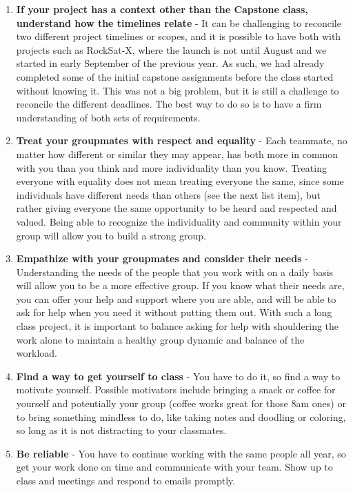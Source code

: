 \documentclass[letterpaper,10pt]{article}
\begin{document}
\begin{enumerate}
{}
\item{
\textbf{If your project has a context other than the Capstone class, understand how the timelines relate} -  It can be challenging to reconcile two different project timelines or scopes, and it is possible to have both with projects such as RockSat-X, where the launch is not until August and we started in early September of the previous year. As such, we had already completed some of the initial capstone assignments before the class started without knowing it. This was not a big problem, but it is still a challenge to reconcile the different deadlines. The best way to do so is to have a firm understanding of both sets of requirements.
}
\item{
\textbf{Treat your groupmates with respect and equality} - Each teammate, no matter how different or similar they may appear, has both more in common with you than you think and more individuality than you know. Treating everyone with equality does not mean treating everyone the same, since some individuals have different needs than others (see the next list item), but rather giving everyone the same opportunity to be heard and respected and valued. Being able to recognize the individuality and community within your group will allow you to build a strong group.
}
\item{
\textbf{Empathize with your groupmates and consider their needs} - Understanding the needs of the people that you work with on a daily basis will allow you to be a more effective group. If you know what their needs are, you can offer your help and support where you are able, and will be able to ask for help when you need it without putting them out. With such a long class project, it is important to balance asking for help with shouldering the work alone to maintain a healthy group dynamic and balance of the workload.
}
\item{
\textbf{Find a way to get yourself to class} - You have to do it, so find a way to motivate yourself. Possible motivators include bringing a snack or coffee for yourself and potentially your group (coffee works great for those 8am ones) or to bring something mindless to do, like taking notes and doodling or coloring, so long as it is not distracting to your classmates.
}
\item{
\textbf{Be reliable} - You have to continue working with the same people all year, so get your work done on time and communicate with your team. Show up to class and meetings and respond to emails promptly.
}
\end{enumerate}
\end{document}
